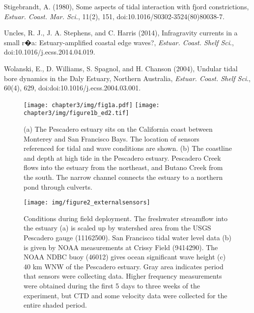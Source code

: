 \begin{thebibliography}{\textit{Ranasinghe and Patttiaratchi}(2003)}
Stigebrandt,
A. (1980), Some aspects of tidal interaction with fjord constrictions,
\emph{Estuar. Coast. Mar. Sci.}, 11(2), 151, doi:10.1016/S0302-3524(80)80038-7. 

Uncles, R.
J., J. A. Stephens, and C. Harris (2014), Infragravity currents in
a small r�a: Estuary-amplified coastal edge waves?, \emph{Estuar.
Coast. Shelf Sci}., doi:10.1016/j.ecss.2014.04.019. 

Wolanski,
E., D. Williams, S. Spagnol, and H. Chanson (2004), Undular tidal
bore dynamics in the Daly Estuary, Northern Australia, \emph{Estuar.
Coast. Shelf Sci}., 60(4), 629, doi:doi:10.1016/j.ecss.2004.03.001. 

\end{thebibliography}



\begin{figure}[t]
\texttt{[image: chapter3/img/fig1a.pdf]}
\texttt{[image: chapter3/img/figure1b\_ed2.tif]}\\
\caption{(a) The Pescadero estuary sits on the California coast between Monterey
and San Francisco Bays. The location of sensors referenced for tidal
and wave conditions are shown. (b) The coastline and depth at high
tide in the Pescadero estuary. Pescadero Creek flows into the estuary
from the northeast, and Butano Creek from the south. The narrow channel
connects the estuary to a northern pond through culverts.}
\label{f1_maps}
\end{figure}


\begin{figure}
\texttt{[image: img/figure2\_externalsensors]}

\protect\caption{Conditions during field deployment. The freshwater streamflow into
the estuary (a) is scaled up by watershed area from the USGS Pescadero
gauge (11162500). San Francisco tidal water level data (b) is given
by NOAA measurements at Crissy Field (9414290). The NOAA NDBC buoy
(46012) gives ocean significant wave height (c) 40 km WNW of the Pescadero
estuary. Gray area indicates period that sensors were collecting data.
Higher frequency measurements were obtained during the first 5 days
to three weeks of the experiment, but CTD and some velocity data were
collected for the entire shaded period. \label{f2_QTHs}}


\end{figure}


